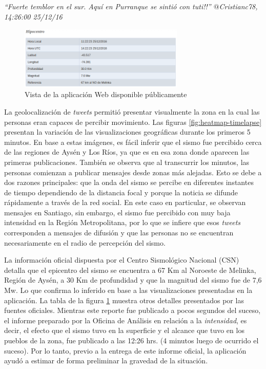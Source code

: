 \textit{``Fuerte temblor en el sur. Aquí en Purranque se sintió con tuti!!'' $@$Cristianc78, 14:26:00 25/12/16}

	\begin{figure}[!h]
	  \centering
	  \includegraphics[trim={0 0 0 0}, clip, width=0.7\textwidth]{imagenes/img-25Dic-Hipocentro.png}
	  \caption{Vista de la aplicación Web disponible públicamente}
		\label{fig:25dic-hipocentro}
	\end{figure}
	
	La geolocalización de \textit{tweets} permitió presentar visualmente la zona en la cual las personas eran capaces de percibir movimiento. Las figuras \ref{fig:heatmap-timelapse} presentan la variación de las visualizaciones geográficas durante los primeros 5 minutos. En base a estas imágenes, es fácil inferir que el sismo fue percibido cerca de las regiones de Aysén y Los Ríos, ya que es en esa zona donde aparecen las primeras publicaciones. También se observa que al transcurrir los minutos, las personas comienzan a publicar mensajes desde zonas más alejadas. Esto se debe a dos razones principales: que la onda del sismo se percibe en diferentes instantes de tiempo dependiendo de la distancia focal y porque la noticia se difunde rápidamente a través de la red social. En este caso en particular, se observan mensajes en Santiago, sin embargo, el sismo fue percibido con muy baja intensidad en la Región Metropolitana, por lo que se infiere que esos \textit{tweets} corresponden a mensajes de difusión y que las personas no se encuentran necesariamente en el radio de percepción del sismo.
		
	La información oficial dispuesta por el Centro Sismológico Nacional (CSN) detalla que el epicentro del sismo se encuentra a 67 Km al Noroeste de Melinka, Región de Aysén, a 30 Km de profundidad y que la magnitud del sismo fue de 7,6 Mw. Lo que confirma lo inferido en base a las visualizaciones presentadas en la aplicación. La tabla de la figura \ref{fig:25dic-hipocentro} muestra otros detalles presentados por las fuentes oficiales. 
	Mientras este reporte fue publicado a pocos segundos del suceso, el informe preparado por la Oficina de Análisis en relación a la {\em intensidad}, es decir, el efecto que el sismo tuvo en la superficie y el alcance que tuvo en los pueblos de la zona, fue publicado a las 12:26 hrs. (4 minutos luego de ocurrido el suceso).
	Por lo tanto, previo a la entrega de este informe oficial, la aplicación ayudó a estimar de forma preliminar la gravedad de la situación. 
	
